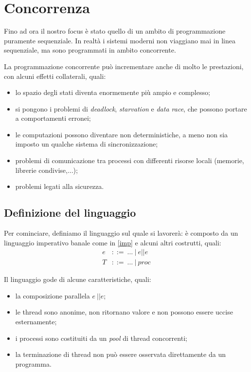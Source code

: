 \documentclass[a4paper, 11pt]{article}
\begin{document}
\newpage
\section{Concorrenza}
Fino ad ora il nostro focus è stato quello di un ambito di programmazione puramente sequenziale. In realtà i sistemi moderni non viaggiano mai in linea sequenziale, ma sono programmati in ambito concorrente.

La programmazione concorrente può incrementare anche di molto le prestazioni, con alcuni effetti collaterali, quali:
\begin{itemize}
	\item lo spazio degli stati diventa enormemente più ampio e complesso;
	\item si pongono i problemi di \textit{deadlock}, \textit{starvation} e \textit{data race}, che possono portare a comportamenti erronei;
	\item le computazioni possono diventare non deterministiche, a meno non sia imposto un qualche sistema di sincronizzazione;
	\item problemi di comunicazione tra processi con differenti risorse locali (memorie, librerie condivise,...);
	\item problemi legati alla sicurezza.
\end{itemize}

\subsection{Definizione del linguaggio}
Per cominciare, definiamo il linguaggio sul quale si lavorerà: è composto da un linguaggio imperativo banale come in \ref{imp} e alcuni altri costrutti, quali: \begin{align*}
	e &::=\ \dots\ |\ e \vert \vert e \\
	T &::=\ \dots\ |\ proc
\end{align*}

Il linguaggio gode di alcune caratteristiche, quali: \begin{itemize}
	\item la composizione parallela $e\ || e$;
	\item le thread sono anonime, non ritornano valore e non possono essere uccise esternamente;
	\item i processi sono costituiti da un \textit{pool} di thread concorrenti;
	\item la terminazione di thread non può essere osservata direttamente da un programma.
\end{itemize}
\end{document}
